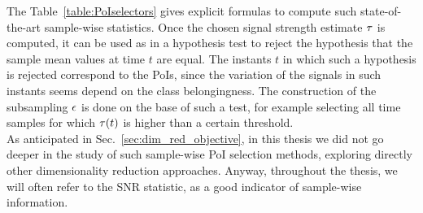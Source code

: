 The Table~\ref{table:PoIselectors} gives explicit formulas to compute such state-of-the-art sample-wise statistics. Once the chosen signal strength estimate $\tau$ is computed, it can be used as in a hypothesis test to reject the hypothesis that the sample mean values at time $t$ are equal. The instants $t$ in which such a hypothesis is rejected correspond to the PoIs, since the variation of the signals in such instants seems depend on the class belongingness. The construction of the subsampling $\epsilon$ is done on the base of such a test, for example selecting all time samples for which $\tau(t)$ is higher than a certain threshold. \\

As anticipated in Sec.~\ref{sec:dim_red_objective}, in this thesis we did not go deeper in the study of such sample-wise PoI selection methods, exploring directly other dimensionality reduction approaches. Anyway, throughout the thesis, we will often refer to the SNR statistic, as a good indicator of sample-wise information.

